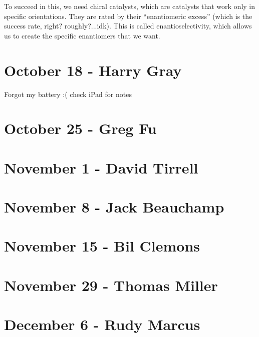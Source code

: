 \documentclass{report}
\begin{document}
To succeed in this, we need chiral catalysts, which are catalysts that work only in specific orientations. They are rated by their "`enantiomeric excess"' (which is the success rate, right? roughly?...idk). This is called enantioselectivity, which allows us to create the specific enantiomers that we want. 

\chapter{October 18 - Harry Gray}

Forgot my battery :( check iPad for notes

\chapter{October 25 - Greg Fu}
\chapter{November 1 - David Tirrell}


\chapter{November 8 - Jack Beauchamp}
\chapter{November 15 - Bil Clemons}
\chapter{November 29 - Thomas Miller}
\chapter{December 6 - Rudy Marcus}
\end{document}
